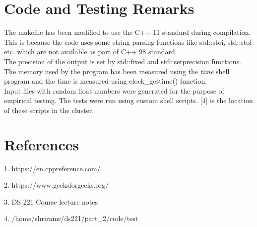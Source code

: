 \documentclass[11pt,a4paper,oneside]{article}
\begin{document}
    \section{Code and Testing Remarks}
    The makefile has been modified to use the C++ 11 standard during compilation. This is because the code uses some string parsing functions like std::stoi, std::stof etc. which are not available as part of C++ 98 standard. \\
    \newline
    The precision of the output is set by std::fixed and std::setprecision functions. The memory used by the program has been measured using the \emph{time} shell program and the time is measured using clock\_gettime() function. \\
    \newline
    Input files with random float numbers were generated for the purpose of empirical testing. The tests were run using custom shell scripts. [4] is the location of these scripts in the cluster.
    
    \section{References}
    
    \begin{list}{}{}
    	\item 1. https://en.cppreference.com/
    	\item 2. https://www.geeksforgeeks.org/
    	\item 3. DS 221 Course lecture notes
    	\item 4. /home/shriramr/ds221/part\_2/code/test
    \end{list}
\end{document}
